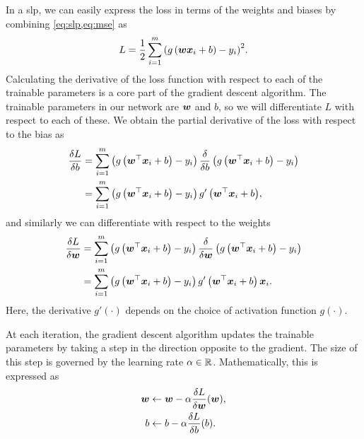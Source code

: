 \documentclass[../main.tex]{subfiles}
\begin{document}
\subsubsection{}
In a \gls{slp}, we can easily express the loss in terms of the weights and biases by combining \cref{eq:slp,eq:mse} as
\begin{equation}
    L = \frac{1}{2} \sum_{i=1}^m{\left(g\left(
        {\bm{w}} {\bm{x}}_i + b
    \right) - y_i\right)^2}.
\end{equation}
Calculating the derivative of the loss function with respect to each of the trainable parameters is a core part of the gradient descent algorithm.
The trainable parameters in our network are ${\bm{w}}$ and $b$, so we will differentiate $L$ with respect to each of these.
We obtain the partial derivative of the loss with respect to the bias as
\begin{align}
    \label{eq:backprop_dL_db}
    \frac{\delta L}{\delta b}
    &= \sum_{i=1}^m{
        \left(g \left({\bm{w}}^\top{\bm{x}}_i+b\right) - y_i \right)
        \frac{\delta}{\delta b} \left(g \left({\bm{w}}^\top{\bm{x}}_i+b\right) - y_i \right)
    } \nonumber \\
    &= \sum_{i=1}^m{
        \left(g \left({\bm{w}}^\top{\bm{x}}_i+b\right) - y_i \right)
        g' \left({\bm{w}}^\top{\bm{x}}_i+b\right)
    },
\end{align}
and similarly we can differentiate with respect to the weights
\begin{align}
    \label{eq:backprop_dL_dw}
    \frac{\delta L}{\delta {\bm{w}}}
    &= \sum_{i=1}^m{
        \left(g \left({\bm{w}}^\top{\bm{x}}_i+b\right) - y_i \right)
        \frac{\delta}{\delta {\bm{w}}} \left(g \left({\bm{w}}^\top{\bm{x}}_i+b\right) - y_i \right)
    } \nonumber \\
    &= \sum_{i=1}^m{
        \left(g \left({\bm{w}}^\top{\bm{x}}_i+b\right) - y_i \right)
        g' \left({\bm{w}}^\top{\bm{x}}_i+b\right)
        {\bm{x}}_i
    }.
\end{align}
Here, the derivative $g'(\cdot)$ depends on the choice of activation function $g(\cdot)$.

At each iteration, the gradient descent algorithm updates the trainable parameters by taking a step in the direction opposite to the gradient.
The size of this step is governed by the learning rate $\alpha \in \mathbb{R}$.
Mathematically, this is expressed as
\begin{align}
    \label{eq:backprop_update_weights}
    {\bm{w}} &\gets {\bm{w}} - \alpha \frac{\delta L}{\delta {\bm{w}}}({\bm{w}}),\\
    \label{eq:backprop_update_bias}
    b &\gets b - \alpha \frac{\delta L}{\delta b}(b).
\end{align}
\end{document}
